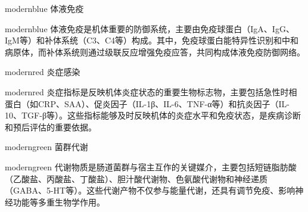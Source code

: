 \documentclass[UTF8]{ctexart}
\begin{document}
\vspace{0.1cm}

\noindent
\begin{minipage}{\textwidth}
\parbox{0.25\textwidth}{%
\begin{titlebox}{modernblue}
    \quad 体液免疫
\end{titlebox}}%
\hfill
\parbox{0.72\textwidth}{%
\begin{contentbox}{modernblue}
    体液免疫是机体重要的防御系统，主要由免疫球蛋白（IgA、IgG、IgM等）和补体系统（C3、C4等）构成。其中，免疫球蛋白能特异性识别和中和病原体，而补体系统则通过级联反应增强免疫应答，共同构成体液免疫防御网络。
\end{contentbox}}
\end{minipage}

\vspace{0.1cm}

\noindent
\begin{minipage}{\textwidth}
\parbox{0.25\textwidth}{
\begin{titlebox}{modernred}
     \quad 炎症感染
\end{titlebox}}
\hfill
\parbox{0.72\textwidth}{
\begin{contentbox}{modernred}
    炎症指标是反映机体炎症状态的重要生物标志物，主要包括急性时相蛋白（如CRP、SAA）、促炎因子（IL-1β、IL-6、TNF-α等）和抗炎因子（IL-10、TGF-β等）。这些指标能够及时反映机体的炎症水平和免疫状态，是疾病诊断和预后评估的重要依据。
\end{contentbox}}
\end{minipage}

\vspace{0.1cm}

\noindent\begin{minipage}{\textwidth}
\parbox{0.25\textwidth}{
\begin{titlebox}{moderngreen}
     \quad 菌群代谢
\end{titlebox}}
\hfill
\parbox{0.72\textwidth}{
\begin{contentbox}{moderngreen}
    代谢物质是肠道菌群与宿主互作的关键媒介，主要包括短链脂肪酸（乙酸盐、丙酸盐、丁酸盐）、胆汁酸代谢物、色氨酸代谢物和神经递质（GABA、5-HT等）。这些代谢产物不仅参与能量代谢，还具有调节免疫、影响神经功能等多重生物学作用。
\end{contentbox}}
\end{minipage}

\vspace{0.1cm}
\end{document}
